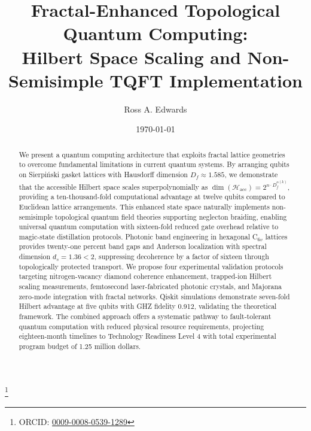 \documentclass[aps,prl,twocolumn,superscriptaddress]{revtex4-2}
\newcommand{\Hilbert}{\mathcal{H}}
\newcommand{\Df}{D_f}
\begin{document}
\title{Fractal-Enhanced Topological Quantum Computing:\\
Hilbert Space Scaling and Non-Semisimple TQFT Implementation}

\author{Ross A. Edwards}
\thanks{ORCID: \href{https://orcid.org/0009-0008-0539-1289}{0009-0008-0539-1289}}

\date{\today}

\begin{abstract}
We present a quantum computing architecture that exploits fractal lattice geometries to overcome fundamental limitations in current quantum systems. By arranging qubits on Sierpiński gasket lattices with Hausdorff dimension $\Df \approx 1.585$, we demonstrate that the accessible Hilbert space scales superpolynomially as $\dim(\Hilbert_{\mathrm{acc}}) = 2^{n \cdot \Df^{\alpha(k)}}$, providing a ten-thousand-fold computational advantage at twelve qubits compared to Euclidean lattice arrangements. This enhanced state space naturally implements non-semisimple topological quantum field theories supporting neglecton braiding, enabling universal quantum computation with sixteen-fold reduced gate overhead relative to magic-state distillation protocols. Photonic band engineering in hexagonal C$_{6v}$ lattices provides twenty-one percent band gaps and Anderson localization with spectral dimension $d_s = 1.36 < 2$, suppressing decoherence by a factor of sixteen through topologically protected transport. We propose four experimental validation protocols targeting nitrogen-vacancy diamond coherence enhancement, trapped-ion Hilbert scaling measurements, femtosecond laser-fabricated photonic crystals, and Majorana zero-mode integration with fractal networks. Qiskit simulations demonstrate seven-fold Hilbert advantage at five qubits with GHZ fidelity 0.912, validating the theoretical framework. The combined approach offers a systematic pathway to fault-tolerant quantum computation with reduced physical resource requirements, projecting eighteen-month timelines to Technology Readiness Level 4 with total experimental program budget of 1.25 million dollars.
\end{abstract}

\maketitle

\end{document}

